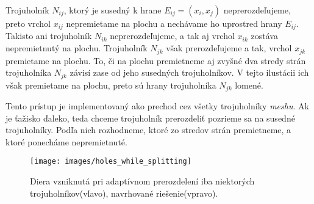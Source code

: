 Trojuholník $N_{ij}$, ktorý je susedný k hrane $E_{ij} = (x_i, x_j)$ neprerozdeľujeme, preto vrchol $x_{ij}$ 
nepremietame na plochu a nechávame ho uprostred hrany $E_{ij}$. Takisto ani trojuholník $N_{ik}$ neprerozdeľujeme,
a tak aj vrchol $x_{ik}$ zostáva nepremietnutý na plochu.
Trojuholník $N_{jk}$ však prerozdeľujeme a tak, vrchol $x_{jk}$ premietame na plochu. To, či na plochu premietneme aj 
zvyšné dva stredy strán trojuholníka $N_{jk}$ závisí zase od jeho susedných trojuholníkov. 
V tejto ilustácii ich však premietame na plochu, preto sú hrany trojuholníka $N_{jk}$ lomené.

Tento prístup je implementovaný ako 
prechod cez všetky trojuholníky \textit{meshu}. Ak je ťažisko ďaleko, teda chceme trojuholník prerozdeliť
pozrieme sa na susedné trojuholníky. Podľa nich rozhodneme, ktoré zo stredov strán premietneme,
a ktoré ponecháme nepremietnuté.

\begin{figure}
    \centerline{\texttt{[image: images/holes\_while\_splitting]}}
    \caption[Úprava adaptívneho podrozdelenia trojuholníkov]
    {Diera vzniknutá pri adaptívnom prerozdelení iba niektorých trojuholníkov(vľavo), 
    navrhované riešenie(vpravo).}
    \label{obr:holes_while_splitting}
\end{figure}